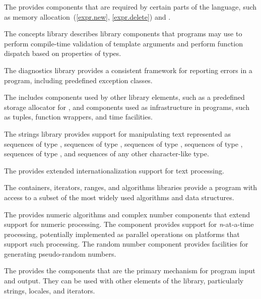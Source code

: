 \pnum
The  provides components that are
required by certain parts of the \Cpp{} language, such as memory allocation~(\ref{expr.new},
\ref{expr.delete}) and .

\pnum
The concepts library describes library components that \Cpp{}
programs may use to perform compile-time validation of template arguments and
perform function dispatch based on properties of types.

\pnum
The diagnostics library provides a consistent framework for
reporting errors in a \Cpp{} program, including predefined exception classes.

\pnum
The  includes components used
by other library elements, such as a predefined storage allocator for , and components used
as infrastructure
in \Cpp{} programs,
such as tuples, function wrappers, and time facilities.

\pnum
The strings library provides support for manipulating text represented
as sequences of type ,
sequences of type ,
sequences of type ,
sequences of type ,
sequences of type ,
and sequences of any other character-like type.

\pnum
The  provides extended internationalization
support for text processing.

\pnum
The containers, iterators, ranges,
and algorithms libraries provide a \Cpp{} program with access
to a subset of the most widely used algorithms and data structures.

\pnum
The  provides
numeric algorithms and complex number components that extend support for numeric processing.
The
component provides support for
\textit{n}-at-a-time
processing,
potentially implemented as parallel operations on platforms that support such processing.
The random number component provides facilities for generating pseudo-random numbers.

\pnum
The  provides the
components that are the primary mechanism for \Cpp{} program input and output.
They can be used with other elements of the library, particularly
strings, locales, and iterators.

